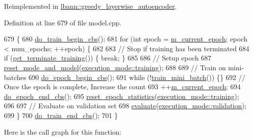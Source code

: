 Reimplemented in \hyperlink{classlbann_1_1greedy__layerwise__autoencoder_a085f0b2debb82d9c4927a1c8b11dd353}{lbann\+::greedy\+\_\+layerwise\+\_\+autoencoder}.



Definition at line 679 of file model.\+cpp.


\begin{DoxyCode}
679                                 \{
680   \hyperlink{classlbann_1_1model_a780395fa740102adda5537aa5d257698}{do\_train\_begin\_cbs}();
681   \textcolor{keywordflow}{for} (\textcolor{keywordtype}{int} epoch = \hyperlink{classlbann_1_1model_a305fac94b9063e59198c7f936923221a}{m\_current\_epoch}; epoch < num\_epochs; ++epoch) \{
682 
683     \textcolor{comment}{// Stop if training has been terminated}
684     \textcolor{keywordflow}{if} (\hyperlink{classlbann_1_1model_a90363b6a20269cf7197701e49f1f52a3}{get\_terminate\_training}()) \{ \textcolor{keywordflow}{break}; \}
685 
686     \textcolor{comment}{// Setup epoch}
687     \hyperlink{classlbann_1_1model_a5d188d75f53e0a4c6161500181b27c03}{reset\_mode\_and\_model}(\hyperlink{base_8hpp_a2781a159088df64ed7d47cc91c4dc0a8ac185ddac8b5a8f5aa23c5b80bc12d214}{execution\_mode::training});
688 
689     \textcolor{comment}{// Train on mini-batches}
690     \hyperlink{classlbann_1_1model_a6f975af3ff4921d78a9eb1aca12eaf5e}{do\_epoch\_begin\_cbs}();
691     \textcolor{keywordflow}{while} (!\hyperlink{classlbann_1_1model_a462105993a63277a1ead39c30ebae1bb}{train\_mini\_batch}()) \{\}
692     \textcolor{comment}{// Once the epoch is complete, Increase the count}
693     ++\hyperlink{classlbann_1_1model_a305fac94b9063e59198c7f936923221a}{m\_current\_epoch};
694     \hyperlink{classlbann_1_1model_a93e43a6c5aaf8ad890ef50ff97dfa176}{do\_epoch\_end\_cbs}();
695     \hyperlink{classlbann_1_1model_a9c6e9c199ca0ae06b8cf7266971ab9c3}{reset\_epoch\_statistics}(\hyperlink{base_8hpp_a2781a159088df64ed7d47cc91c4dc0a8ac185ddac8b5a8f5aa23c5b80bc12d214}{execution\_mode::training});
696 
697     \textcolor{comment}{// Evaluate on validation set}
698     \hyperlink{classlbann_1_1model_a4191097fdbcd1686525e9cd150f958ef}{evaluate}(\hyperlink{base_8hpp_a2781a159088df64ed7d47cc91c4dc0a8aa617908b172c473cb8e8cda059e55bf0}{execution\_mode::validation});
699   \}
700   \hyperlink{classlbann_1_1model_a13bb6edae42c719b78454a8af9549122}{do\_train\_end\_cbs}();
701 \}
\end{DoxyCode}
Here is the call graph for this function\+:\nopagebreak
